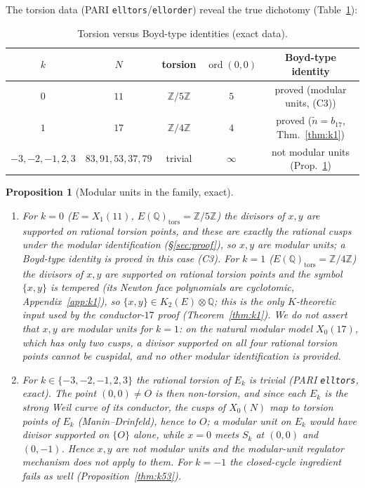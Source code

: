 \documentclass[11pt]{amsart}
\newtheorem{proposition}[theorem]{Proposition}
\theoremstyle{definition}
\theoremstyle{remark}
\newcommand{\Q}{\mathbb{Q}}
\newcommand{\Z}{\mathbb{Z}}
\begin{document}
The torsion data (PARI \texttt{elltors}/\texttt{ellorder}) reveal the true
dichotomy (Table~\ref{tab:torsion}):

\begin{table}[ht]
\centering\footnotesize
\begin{tabular}{@{}ccccc@{}}
\toprule
$k$ & $N$ & torsion & $\operatorname{ord}(0,0)$ & Boyd-type identity\\
\midrule
$0$ & $11$ & $\Z/5\Z$ & $5$ & proved (modular units, (C3))\\
$1$ & $17$ & $\Z/4\Z$ & $4$ & proved ($\tilde n=b_{17}$, Thm.~\ref{thm:k1})\\
$-3,-2,-1,2,3$ & $83,91,53,37,79$ & trivial & $\infty$ & not modular units
  (Prop.~\ref{thm:family})\\
\bottomrule
\end{tabular}
\caption{Torsion versus Boyd-type identities (exact data).}
\label{tab:torsion}
\end{table}

\begin{proposition}[Modular units in the family, exact]\label{thm:family}
\leavevmode
\begin{enumerate}
  \item For $k=0$ ($E=X_1(11)$, $E(\Q)_{\mathrm{tors}}=\Z/5\Z$) the divisors
  of $x,y$ are supported on rational torsion points, and these are exactly
  the rational cusps under the modular identification (\S\ref{sec:proof}),
  so $x,y$ are modular units; a Boyd-type identity is \emph{proved}
  in this case \emph{(C3)}.
  For $k=1$ ($E(\Q)_{\mathrm{tors}}=\Z/4\Z$) the divisors of $x,y$ are
  supported on rational torsion points and the symbol $\{x,y\}$ is tempered
  (its Newton face polynomials are cyclotomic, Appendix~\ref{app:k1}), so
  $\{x,y\}\in K_2(E)\otimes\Q$; this is the only $K$-theoretic input used
  by the conductor-$17$ proof (Theorem~\ref{thm:k1}).  We do \emph{not}
  assert that $x,y$ are modular units for $k=1$: on the natural modular
  model $X_0(17)$, which has only two cusps, a divisor supported on all
  four rational torsion points cannot be cuspidal, and no other modular
  identification is provided.
  \item For $k\in\{-3,-2,-1,2,3\}$ the rational torsion of $E_k$ is trivial
  (PARI \texttt{elltors}, exact). The point $(0,0)\neq O$ is then
  non-torsion, and since each $E_k$ is the strong Weil curve of its
  conductor, the cusps of $X_0(N)$ map to torsion points of $E_k$
  (Manin--Drinfeld), hence to $O$; a modular unit on $E_k$ would have
  divisor supported on $\{O\}$ alone, while $x=0$ meets $S_k$ at
  $(0,0)$ and $(0,-1)$. Hence $x,y$ are \emph{not} modular units and the
  modular-unit regulator mechanism does not apply to them. For $k=-1$ the
  closed-cycle ingredient fails as well
  (Proposition~\ref{thm:k53}).
\end{enumerate}
\end{proposition}
\end{document}
